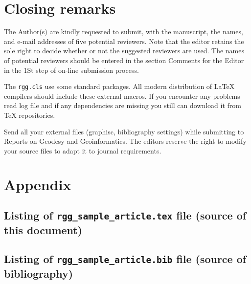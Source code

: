 \documentclass{rgg}
\begin{document}
  \section{Closing remarks}
    The Author(s) are kindly requested to submit, with the manuscript, 
    the names, and e-mail addresses of five potential reviewers. Note 
    that the editor retains the sole right to decide whether or not the 
    suggested reviewers are used. The names of potential reviewers should 
    be entered in the section Comments for the Editor in the 1St step of 
    on-line submission process.

    The \texttt{rgg.cls} use some standard packages.
    All modern distribution of \LaTeX{} compilers should include
    these external macros.
    If you encounter any problems read log file and if any dependencies are 
    missing you still can download it from \TeX{} repositories.

    Send all your external files (graphisc, bibliography settings) while
    submitting to Reports on Geodesy and Geoinformatics.
    The editors reserve the right to modify your source files to adapt it to 
    journal requirements.


    


    \clearpage
  \section*{Appendix}

  \subsection*{Listing of \texttt{rgg\_sample\_article.tex} file
      (source of this document)}
    {\scriptsize}

  \subsection*{Listing of \texttt{rgg\_sample\_article.bib} file 
      (source of bibliography)}
    {\scriptsize}
\end{document}
